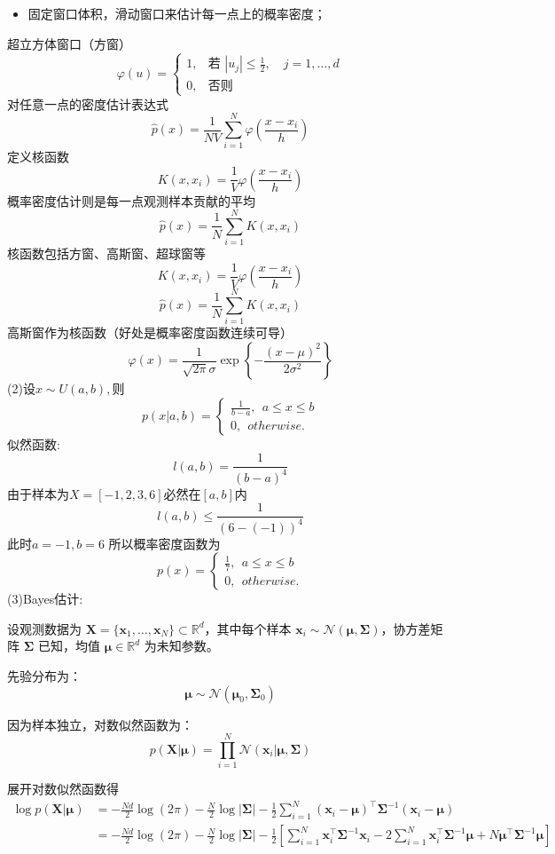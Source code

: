 \documentclass{article}
\begin{document}
\begin{itemize}
  \item 固定窗口体积，滑动窗口来估计每一点上的概率密度；
\end{itemize}
超立方体窗口（方窗）
\[
\varphi(u) =
\begin{cases}
1, & \text{若 } |u_j| \leq \frac{1}{2},\quad j = 1, \dots, d \\
0, & \text{否则}
\end{cases}
\]
对任意一点的密度估计表达式
\[
\hat{p}(x) = \frac{1}{NV} \sum_{i=1}^{N} \varphi\left( \frac{x - x_i}{h} \right)
\]
定义核函数
\[
K(x, x_i) = \frac{1}{V} \varphi\left( \frac{x - x_i}{h} \right)
\]
概率密度估计则是每一点观测样本贡献的平均
\[
\hat{p}(x) = \frac{1}{N} \sum_{i=1}^{N} K(x, x_i)
\]
核函数包括方窗、高斯窗、超球窗等
\[
K(x, x_i) = \frac{1}{V} \varphi\left( \frac{x - x_i}{h} \right)
\]
\[
\hat{p}(x) = \frac{1}{N} \sum_{i=1}^{N} K(x, x_i)
\]
高斯窗作为核函数（好处是概率密度函数连续可导）
\[
\varphi(x) = \frac{1}{\sqrt{2\pi} \sigma} \exp \left\{ -\frac{(x - \mu)^2}{2\sigma^2} \right\}
\]
(2)设$x\sim U(a,b),$则
\[p(x|a,b)=
\begin{cases}
  \frac{1}{b-a},~~a\leq x\leq b\\
  0,~~otherwise.
\end{cases}  
\]
似然函数:
\[l(a,b)=\frac{1}{(b-a)^4}\]
由于样本为$X=[-1,2,3,6]$必然在$[a,b]$内
\[l(a,b)\leq \frac{1}{(6-(-1))^4}\]此时$a=-1,b=6$
所以概率密度函数为
\[p(x)=
\begin{cases}
  \frac{1}{7},~~a\leq x\leq b\\
  0,~~otherwise.
\end{cases}  
\]
(3)Bayes估计:

设观测数据为 \( \mathbf{X} = \{\mathbf{x}_1, \ldots, \mathbf{x}_N\} \subset \mathbb{R}^d \)，其中每个样本 \( \mathbf{x}_i \sim \mathcal{N}(\boldsymbol{\mu}, \boldsymbol{\Sigma}) \)，协方差矩阵 \( \boldsymbol{\Sigma} \) 已知，均值 \( \boldsymbol{\mu} \in \mathbb{R}^d \) 为未知参数。

先验分布为：
\[
\boldsymbol{\mu} \sim \mathcal{N}(\boldsymbol{\mu}_0, \boldsymbol{\Sigma}_0)
\]

因为样本独立，对数似然函数为：
\[
p(\mathbf{X} | \boldsymbol{\mu}) = \prod_{i=1}^N \mathcal{N}(\mathbf{x}_i | \boldsymbol{\mu}, \boldsymbol{\Sigma})
\]

展开对数似然函数得
\begin{align*}
\log p(\mathbf{X}|\boldsymbol{\mu}) 
&= -\frac{Nd}{2} \log(2\pi) - \frac{N}{2} \log |\boldsymbol{\Sigma}| 
- \frac{1}{2} \sum_{i=1}^N (\mathbf{x}_i - \boldsymbol{\mu})^\top \boldsymbol{\Sigma}^{-1} (\mathbf{x}_i - \boldsymbol{\mu}) \\
&= -\frac{Nd}{2} \log(2\pi) - \frac{N}{2} \log |\boldsymbol{\Sigma}| 
- \frac{1}{2} \left[ \sum_{i=1}^N \mathbf{x}_i^\top \boldsymbol{\Sigma}^{-1} \mathbf{x}_i - 2 \sum_{i=1}^N \mathbf{x}_i^\top \boldsymbol{\Sigma}^{-1} \boldsymbol{\mu} + N \boldsymbol{\mu}^\top \boldsymbol{\Sigma}^{-1} \boldsymbol{\mu} \right]
\end{align*}
\end{document}
